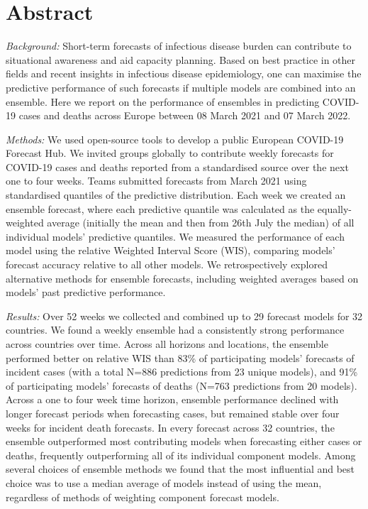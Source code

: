 \documentclass[
]{article}
\begin{document}
\hypertarget{abstract}{%
\section{Abstract}\label{abstract}}

\emph{Background:} Short-term forecasts of infectious disease burden can contribute to situational awareness and aid capacity planning. Based on best practice in other fields and recent insights in infectious disease epidemiology, one can maximise the predictive performance of such forecasts if multiple models are combined into an ensemble. Here we report on the performance of ensembles in predicting COVID-19 cases and deaths across Europe between 08 March 2021 and 07 March 2022.

\emph{Methods:} We used open-source tools to develop a public European COVID-19 Forecast Hub. We invited groups globally to contribute weekly forecasts for COVID-19 cases and deaths reported from a standardised source over the next one to four weeks. Teams submitted forecasts from March 2021 using standardised quantiles of the predictive distribution. Each week we created an ensemble forecast, where each predictive quantile was calculated as the equally-weighted average (initially the mean and then from 26th July the median) of all individual models' predictive quantiles. We measured the performance of each model using the relative Weighted Interval Score (WIS), comparing models' forecast accuracy relative to all other models. We retrospectively explored alternative methods for ensemble forecasts, including weighted averages based on models' past predictive performance.

\emph{Results:} Over 52 weeks we collected and combined up to 29 forecast models for 32 countries. We found a weekly ensemble had a consistently strong performance across countries over time. Across all horizons and locations, the ensemble performed better on relative WIS than 83\% of participating models' forecasts of incident cases (with a total N=886 predictions from 23 unique models), and 91\% of participating models' forecasts of deaths (N=763 predictions from 20 models). Across a one to four week time horizon, ensemble performance declined with longer forecast periods when forecasting cases, but remained stable over four weeks for incident death forecasts. In every forecast across 32 countries, the ensemble outperformed most contributing models when forecasting either cases or deaths, frequently outperforming all of its individual component models. Among several choices of ensemble methods we found that the most influential and best choice was to use a median average of models instead of using the mean, regardless of methods of weighting component forecast models.
\end{document}
